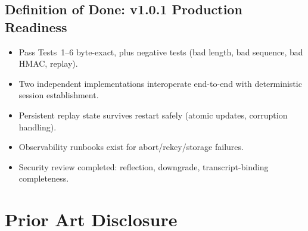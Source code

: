 \documentclass[12pt,letterpaper]{article}
\theoremstyle{plain}
\theoremstyle{definition}
\begin{document}
\subsection{Definition of Done: v1.0.1 Production Readiness}

\begin{itemize}[leftmargin=2em]
  \item Pass Tests~1--6 byte-exact, plus negative tests (bad length, bad
    sequence, bad HMAC, replay).
  \item Two independent implementations interoperate end-to-end with
    deterministic session establishment.
  \item Persistent replay state survives restart safely (atomic updates,
    corruption handling).
  \item Observability runbooks exist for abort/rekey/storage failures.
  \item Security review completed: reflection, downgrade,
    transcript-binding completeness.
\end{itemize}

\section{Prior Art Disclosure}
\label{sec:priorart}
\end{document}
